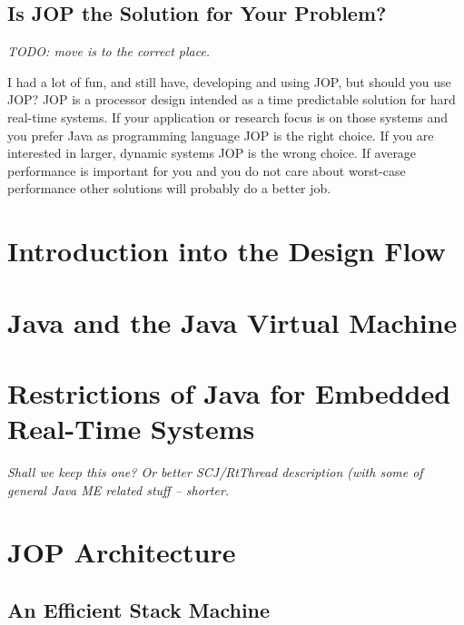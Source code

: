 \section{Is JOP the Solution for Your Problem?}

\emph{TODO: move is to the correct place.}

I had a lot of fun, and still have, developing and using JOP, but
should you use JOP? JOP is a processor design intended as a time
predictable solution for hard real-time systems. If your application
or research focus is on those systems and you prefer Java as
programming language JOP is the right choice. If you are interested
in larger, dynamic systems JOP is the wrong choice. If average
performance is important for you and you do not care about
worst-case performance other solutions will probably do a better
job.





\chapter{Introduction into the Design Flow}
\label{chap:build}


\chapter{Java and the Java Virtual Machine}
\label{chap:java}


\chapter{Restrictions of Java for Embedded Real-Time Systems}
\emph{Shall we keep this one? Or better SCJ/RtThread description
(with some of general Java ME related stuff -- shorter.}

\label{chap:rtjava}
    

\chapter{JOP Architecture}
\label{chap:arch}

    
    
    

\clearpage
    \section{An Efficient Stack Machine}
    \label{sec:stack}
    

